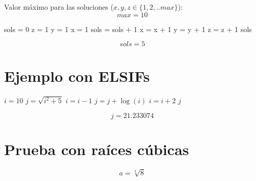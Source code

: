 \documentclass{article}
\begin{document}
Valor máximo para las soluciones ($x, y, z \in \{1,2,..max\}$):
\begin{equation}
max = 10
\label{eq:calc:max}
\end{equation}



\begin{algorithm}
\caption{Número de soluciones}
\label{alg:calc:numsols}
\begin{algorithmic}
    \STATE sols = 0
    \STATE z = 1
        \STATE y = 1
            \STATE x = 1
                    \STATE sols = sols + 1
                \ENDIF
                \STATE x = x + 1
            \ENDWHILE
            \STATE y = y + 1
        \ENDWHILE
        \STATE z = z + 1
    \ENDWHILE
    \RETURN sols
\end{algorithmic}
\end{algorithm}

\begin{equation}
    sols = 
    5
    \label{eq:res:sols}
\end{equation}


\section{Ejemplo con ELSIFs}

\begin{algorithm}
\caption{Ejemplo de un algoritmo con ELSIFs anidados}
\label{alg:calc:Ejemplo con ELSIF}
\begin{algorithmic}
        \STATE $i = 10$
        \STATE $j = \sqrt{i^2 + 5}$
            \STATE $i = i - 1$
                \STATE $j = j + \log(i)$
            \ENDWHILE
            \STATE $i = i + 2$
        \ENDIF
        \RETURN $j$
\end{algorithmic}
\end{algorithm}



\begin{equation}
    j = 
    21.233074
    \label{eq:res:j}
\end{equation}

\section{Prueba con raíces cúbicas}
\begin{equation}
    a = \sqrt[3]{8}
    \label{eq:calc:a}
\end{equation}
\end{document}
